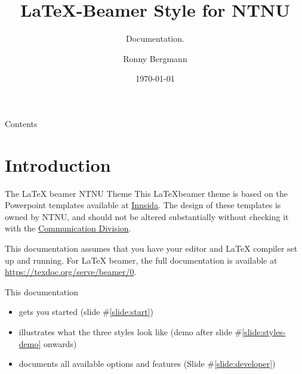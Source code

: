 \documentclass[aspectratio=169]{beamer}
\title{\LaTeX{}-Beamer Style for NTNU}
\subtitle{Documentation.}
\author{Ronny Bergmann}
\date{\today}
\begin{document}
	\maketitle
	\begin{frame}{Contents}
		\tableofcontents
	\end{frame}

	\section{Introduction}
		\begin{frame}{The \LaTeX{} beamer NTNU Theme}
			This \LaTeX beamer theme is based on the Powerpoint templates available at \href{https://innsida.ntnu.no/wiki/-/wiki/English/Create+NTNU+presentations\#section-Create+NTNU+presentations-Powerpoint+templates}{Innsida}.
			The design of these templates is owned by NTNU, and should not be altered
	substantially without checking it with the \href{https://www.ntnu.no/adm/komm}{Communication Division}.

			This documentation assumes that you have your editor and \LaTeX{} compiler set up and running. For \LaTeX{} beamer, the full documentation is available at \url{https://texdoc.org/serve/beamer/0}.

			This documentation
			\begin{itemize}
				\item gets you started (slide \#\ref{slide:start})
				\item illustrates what the three styles look like (demo after slide \#\ref{slide:styles-demo} onwards)
				\item documents all available options and features (Slide \#\ref{slide:developer})
			\end{itemize}
		\end{frame}
\end{document}
